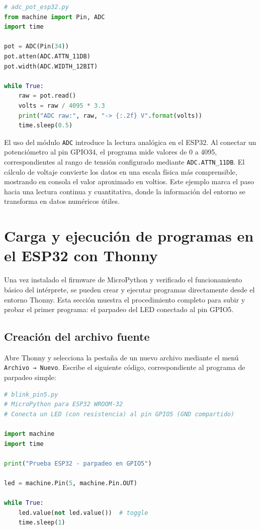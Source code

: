 \documentclass[a4paper,12pt]{article}
\begin{document}
\begin{lstlisting}[language=Python, caption={Lectura analógica desde GPIO34}]
# adc_pot_esp32.py
from machine import Pin, ADC
import time

pot = ADC(Pin(34))
pot.atten(ADC.ATTN_11DB)
pot.width(ADC.WIDTH_12BIT)

while True:
    raw = pot.read()
    volts = raw / 4095 * 3.3
    print("ADC raw:", raw, "-> {:.2f} V".format(volts))
    time.sleep(0.5)
\end{lstlisting}

El uso del módulo \texttt{ADC} introduce la lectura analógica en el ESP32. Al conectar un potenciómetro al pin GPIO34, el programa mide valores de 0 a 4095, correspondientes al rango de tensión configurado mediante \texttt{ADC.ATTN\_11DB}.  
El cálculo de voltaje convierte los datos en una escala física más comprensible, mostrando en consola el valor aproximado en voltios. Este ejemplo marca el paso hacia una lectura continua y cuantitativa, donde la información del entorno se transforma en datos numéricos útiles.

    



\section{Carga y ejecución de programas en el ESP32 con Thonny}

Una vez instalado el firmware de MicroPython y verificado el funcionamiento básico del intérprete, se pueden crear y ejecutar programas directamente desde el entorno Thonny. Esta sección muestra el procedimiento completo para subir y probar el primer programa: el parpadeo del LED conectado al pin GPIO5.

\subsection{Creación del archivo fuente}
Abre Thonny y selecciona la pestaña de un nuevo archivo mediante el menú \texttt{Archivo → Nuevo}.  
Escribe el siguiente código, correspondiente al programa de parpadeo simple:

\begin{lstlisting}[language=Python, caption={blink\_pin5.py -- Parpadeo del LED en GPIO5}, label={lst:blink}]
# blink_pin5.py
# MicroPython para ESP32 WROOM-32
# Conecta un LED (con resistencia) al pin GPIO5 (GND compartido)

import machine
import time

print("Prueba ESP32 - parpadeo en GPIO5")

led = machine.Pin(5, machine.Pin.OUT)

while True:
    led.value(not led.value())  # toggle
    time.sleep(1)
\end{lstlisting}
\end{document}
